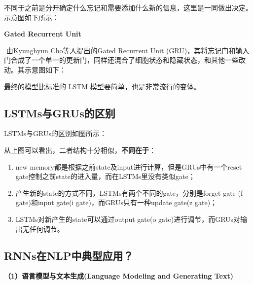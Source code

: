 ​
不同于之前是分开确定什么忘记和需要添加什么新的信息，这里是一同做出决定。示意图如下所示：


\textbf{Gated Recurrent Unit}

​ 由Kyunghyun Cho等人提出的Gated Recurrent Unit
(GRU)，其将忘记门和输入门合成了一个单一的更新门，同样还混合了细胞状态和隐藏状态，和其他一些改动。其示意图如下：


最终的模型比标准的 LSTM 模型要简单，也是非常流行的变体。

\subsection{LSTMs与GRUs的区别}\label{lstmsux4e0egrusux7684ux533aux522b}

LSTMs与GRUs的区别如图所示：


从上图可以看出，二者结构十分相似，\textbf{不同在于}：

\begin{enumerate}
\def\labelenumi{\arabic{enumi}.}
\item
  new memory都是根据之前state及input进行计算，但是GRUs中有一个reset
  gate控制之前state的进入量，而在LSTMs里没有类似gate；
\item
  产生新的state的方式不同，LSTMs有两个不同的gate，分别是forget gate (f
  gate)和input gate(i gate)，而GRUs只有一种update gate(z gate)；
\item
  LSTMs对新产生的state可以通过output gate(o
  gate)进行调节，而GRUs对输出无任何调节。
\end{enumerate}

\subsection{RNNs在NLP中典型应用？}\label{rnnsux5728nlpux4e2dux5178ux578bux5e94ux7528}

\textbf{（1）语言模型与文本生成(Language Modeling and Generating Text)}

